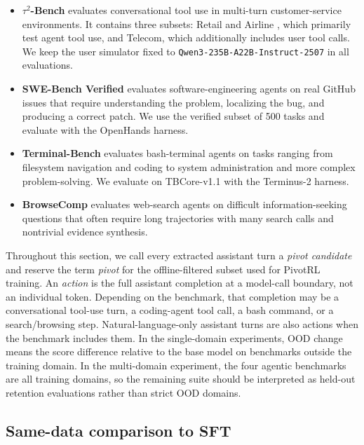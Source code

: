 \begin{itemize}
  \item \textbf{$\tau^2$-Bench} \citep{barres2025tau2bench} evaluates conversational tool use in multi-turn customer-service environments. It contains three subsets: Retail and Airline \citep{yao2024taubench}, which primarily test agent tool use, and Telecom, which additionally includes user tool calls. We keep the user simulator fixed to \texttt{Qwen3-235B-A22B-Instruct-2507} in all evaluations.
  
  \item \textbf{SWE-Bench Verified} \citep{jimenez2024swebench} evaluates software-engineering agents on real GitHub issues that require understanding the problem, localizing the bug, and producing a correct patch. We use the verified subset of 500 tasks and evaluate with the OpenHands harness.

  \item \textbf{Terminal-Bench} \citep{tbench_2025} evaluates bash-terminal agents on tasks ranging from filesystem navigation and coding to system administration and more complex problem-solving. We evaluate on TBCore-v1.1 with the Terminus-2 harness.

  \item \textbf{BrowseComp} \citep{wei2025browsecompsimplechallengingbenchmark} evaluates web-search agents on difficult information-seeking questions that often require long trajectories with many search calls and nontrivial evidence synthesis.
\end{itemize}

Throughout this section, we call every extracted assistant turn a \emph{pivot candidate} and reserve the term \emph{pivot} for the offline-filtered subset used for PivotRL training. An \emph{action} is the full assistant completion at a model-call boundary, not an individual token. Depending on the benchmark, that completion may be a conversational tool-use turn, a coding-agent tool call, a bash command, or a search/browsing step. Natural-language-only assistant turns are also actions when the benchmark includes them. In the single-domain experiments, OOD change means the score difference relative to the base model on benchmarks outside the training domain. In the multi-domain experiment, the four agentic benchmarks are all training domains, so the remaining suite should be interpreted as held-out retention evaluations rather than strict OOD domains.

\subsection{Same-data comparison to SFT}
\label{sec:same_data_sft}

